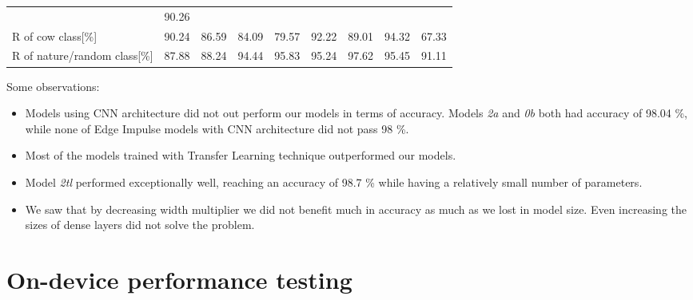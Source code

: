 \begin{table}[!htbp]
{\begin{tabular}{lrrrrrrrr}
                                        & \cellcolor{tbyellow} 90.26 \\
        R of cow class[\%]              & \cellcolor{tbyellow} 90.24 
                                        & \cellcolor{tbyellow} 86.59 
                                        & \cellcolor{tbyellow} 84.09 
                                        & \cellcolor{tbyellow} 79.57 
                                        & \cellcolor{tbgreeny} 92.22 
                                        & \cellcolor{tbyellow} 89.01 
                                        & \cellcolor{tbgreen} 94.32 
                                        & \cellcolor{tbred} 67.33 \\
        R of nature/random class[\%]    & \cellcolor{tbyellow} 87.88 
                                        & \cellcolor{tbyellow} 88.24 
                                        & \cellcolor{tbyellow} 94.44 
                                        & \cellcolor{tbgreeny} 95.83 
                                        & \cellcolor{tbgreeny} 95.24 
                                        & \cellcolor{tbgreen} 97.62 
                                        & \cellcolor{tbgreeny} 95.45 
                                        & \cellcolor{tbyellow} 91.11 \\\bottomrule
    \end{tabular}}
    \label{precision_recall_table_ei}
\end{table}
\clearpage

Some observations:
\begin{itemize}
    \item Models using CNN architecture did not out perform our models in terms of accuracy. Models \textit{2a} and \textit{0b} both had accuracy of 98.04 \%, while none of Edge Impulse models with CNN architecture did not pass 98 \%.
    \item Most of the models trained with Transfer Learning technique outperformed our models.
    \item Model \textit{2tl} performed exceptionally well, reaching an accuracy of 98.7 \% while having a relatively small number of parameters.
    \item We saw that by decreasing width multiplier we did not benefit much in accuracy as much as we lost in model size. Even increasing the sizes of dense layers did not solve the problem. 
\end{itemize}


\section{ On-device performance testing}

